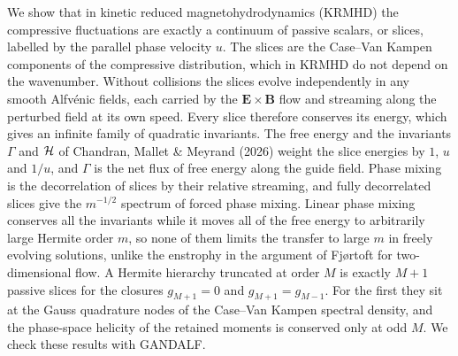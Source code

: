 We show that in kinetic reduced magnetohydrodynamics (KRMHD) the compressive fluctuations are exactly a continuum of passive scalars, or slices, labelled by the parallel phase velocity $u$. The slices are the Case--Van Kampen components of the compressive distribution, which in KRMHD do not depend on the wavenumber. Without collisions the slices evolve independently in any smooth Alfv\'enic fields, each carried by the $\boldsymbol E\times\boldsymbol B$ flow and streaming along the perturbed field at its own speed. Every slice therefore conserves its energy, which gives an infinite family of quadratic invariants. The free energy and the invariants $\Gamma$ and $\mathcal H$ of Chandran, Mallet \& Meyrand (2026) weight the slice energies by $1$, $u$ and $1/u$, and $\Gamma$ is the net flux of free energy along the guide field. Phase mixing is the decorrelation of slices by their relative streaming, and fully decorrelated slices give the $m^{-1/2}$ spectrum of forced phase mixing. Linear phase mixing conserves all the invariants while it moves all of the free energy to arbitrarily large Hermite order $m$, so none of them limits the transfer to large $m$ in freely evolving solutions, unlike the enstrophy in the argument of Fj{\o}rtoft for two-dimensional flow. A Hermite hierarchy truncated at order $M$ is exactly $M+1$ passive slices for the closures $g_{M+1}=0$ and $g_{M+1}=g_{M-1}$. For the first they sit at the Gauss quadrature nodes of the Case--Van Kampen spectral density, and the phase-space helicity of the retained moments is conserved only at odd $M$. We check these results with GANDALF.
